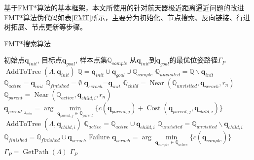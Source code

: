 \documentclass[lang=chs, degree=master, blindreview=false, winfonts=true]{yanputhesis}
\begin{document}
基于FMT*算法的基本框架，本文所使用的针对航天器极近距离逼近问题的改进FMT*算法伪代码如表\ref{FMT}所示，主要分为初始化、节点搜索、反向链接、行进树拓展、节点更新等步骤。

\begin{algorithm}[htb]  
	\caption{FMT*搜索算法}  
	\label{FMT}  
	\begin{algorithmic}[1]  
		\Require  
		初始点$\boldsymbol{q}_{init}$,
		目标点$\boldsymbol{q}_{goal}$,
		样本点集$\mathbb{Q}_{sample}$
		\Ensure  
		从$\boldsymbol{q}_{init}$到$\boldsymbol{q}_{goal}$的最优位姿路径$\Gamma_{P}$
		\State $\operatorname{AddToTree}\left(\Lambda,\boldsymbol{q}_{init}\right)$
		\State$\mathbb{Q}=\boldsymbol{q}_{init}\cup \boldsymbol{q}_{goal}\cup \mathbb{Q}_{sample}$
		\State $\mathbb{Q}_{unvisited}=\mathbb{Q} \backslash \boldsymbol{q}_{init}$
		\State $\mathbb{Q}_{active}=\boldsymbol{q}_{init}$
		\State $\mathbb{Q}_{finished}=\emptyset$ 
		\State $\boldsymbol{q}_{serach}$=$\boldsymbol{q}_{init}$
		\State $\mathbb{Q}_{child} = \operatorname{Near}\left(\mathbb{Q}_{unvisited}, \boldsymbol{q}_{serach}, r_n\right)$
		\State $\mathbb{Q}_{parent} = \operatorname{Near}\left(\mathbb{Q}_{active}, \boldsymbol{q}_{child,i}, r_n\right)$
		\State $\boldsymbol{q}_{parent,j_{\min}}=\arg \min \limits_{\boldsymbol{q}_{parent,j} \in \mathbb{Q}_{parent}}\{c(\boldsymbol{q}_{parent,j})+\operatorname{Cost}\left(\boldsymbol{q}_{parent,j}, \boldsymbol{q}_{child,i}\right)\} \quad$
		\State $\operatorname{AddToTree}\left(\Lambda,\boldsymbol{q}_{child,i}\right)$
		\State $\mathbb{Q}_{active}=\mathbb{Q}_{active}\cup \boldsymbol{q}_{child,i}$
		\State $\mathbb{Q}_{unvisited}=\mathbb{Q}_{unvisited}\backslash \boldsymbol{q}_{child,i}$
		\EndIf
		\EndFor
		\State $\mathbb{Q}_{finished}=\mathbb{Q}_{finished}\cup \boldsymbol{q}_{serach}$
		\State \Return Failure
		\EndIf
		\State $\boldsymbol{q}_{serach}=\arg \min \limits_{\boldsymbol{q}_{sample} \in \mathbb{Q}_{active}}\{c(\boldsymbol{q}_{sample})\} \quad$
		\EndWhile
		\State $\Gamma_{P}=\operatorname{GetPath}\left(\Lambda \right)$
		\State \Return $\Gamma_{P}$
	\end{algorithmic}
\end{algorithm}
\end{document}

